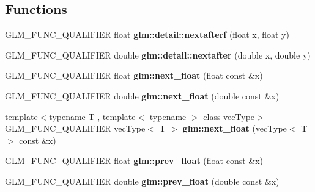 \subsection*{Functions}
\begin{DoxyCompactItemize}
\item 
\hypertarget{namespaceglm_1_1detail_ab0eb795c482130b1d6c83470bdb031e6}{}G\+L\+M\+\_\+\+F\+U\+N\+C\+\_\+\+Q\+U\+A\+L\+I\+F\+I\+E\+R float {\bfseries glm\+::detail\+::nextafterf} (float x, float y)\label{namespaceglm_1_1detail_ab0eb795c482130b1d6c83470bdb031e6}

\item 
\hypertarget{namespaceglm_1_1detail_a3c14f8400407e8b4cff5be12ceef2c1e}{}G\+L\+M\+\_\+\+F\+U\+N\+C\+\_\+\+Q\+U\+A\+L\+I\+F\+I\+E\+R double {\bfseries glm\+::detail\+::nextafter} (double x, double y)\label{namespaceglm_1_1detail_a3c14f8400407e8b4cff5be12ceef2c1e}

\item 
\hypertarget{namespaceglm_ab8cb873dacaa59ccbef0ccb9e4361934}{}G\+L\+M\+\_\+\+F\+U\+N\+C\+\_\+\+Q\+U\+A\+L\+I\+F\+I\+E\+R float {\bfseries glm\+::next\+\_\+float} (float const \&x)\label{namespaceglm_ab8cb873dacaa59ccbef0ccb9e4361934}

\item 
\hypertarget{namespaceglm_a465f16ebf0c7afa44168fb1976e1ffce}{}G\+L\+M\+\_\+\+F\+U\+N\+C\+\_\+\+Q\+U\+A\+L\+I\+F\+I\+E\+R double {\bfseries glm\+::next\+\_\+float} (double const \&x)\label{namespaceglm_a465f16ebf0c7afa44168fb1976e1ffce}

\item 
\hypertarget{namespaceglm_abd36d974bf5f55a370accf62cd2bf01d}{}{\footnotesize template$<$typename T , template$<$ typename $>$ class vec\+Type$>$ }\\G\+L\+M\+\_\+\+F\+U\+N\+C\+\_\+\+Q\+U\+A\+L\+I\+F\+I\+E\+R vec\+Type$<$ T $>$ {\bfseries glm\+::next\+\_\+float} (vec\+Type$<$ T $>$ const \&x)\label{namespaceglm_abd36d974bf5f55a370accf62cd2bf01d}

\item 
\hypertarget{namespaceglm_a1fd407652d7ccfbe810674a2e5cbc8eb}{}G\+L\+M\+\_\+\+F\+U\+N\+C\+\_\+\+Q\+U\+A\+L\+I\+F\+I\+E\+R float {\bfseries glm\+::prev\+\_\+float} (float const \&x)\label{namespaceglm_a1fd407652d7ccfbe810674a2e5cbc8eb}

\item 
\hypertarget{namespaceglm_a82cdd5674b80569f118b33a6a327c9bd}{}G\+L\+M\+\_\+\+F\+U\+N\+C\+\_\+\+Q\+U\+A\+L\+I\+F\+I\+E\+R double {\bfseries glm\+::prev\+\_\+float} (double const \&x)\label{namespaceglm_a82cdd5674b80569f118b33a6a327c9bd}


\end{DoxyCompactItemize}
